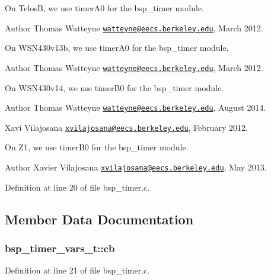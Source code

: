 On TelosB, we use timer\+A0 for the bsp\+\_\+timer module.

\begin{DoxyAuthor}{Author}
Thomas Watteyne \href{mailto:watteyne@eecs.berkeley.edu}{\tt watteyne@eecs.\+berkeley.\+edu}, March 2012.
\end{DoxyAuthor}
On W\+S\+N430v13b, we use timer\+A0 for the bsp\+\_\+timer module.

\begin{DoxyAuthor}{Author}
Thomas Watteyne \href{mailto:watteyne@eecs.berkeley.edu}{\tt watteyne@eecs.\+berkeley.\+edu}, March 2012.
\end{DoxyAuthor}
On W\+S\+N430v14, we use timer\+B0 for the bsp\+\_\+timer module.

\begin{DoxyAuthor}{Author}
Thomas Watteyne \href{mailto:watteyne@eecs.berkeley.edu}{\tt watteyne@eecs.\+berkeley.\+edu}, August 2014.

Xavi Vilajosana \href{mailto:xvilajosana@eecs.berkeley.edu}{\tt xvilajosana@eecs.\+berkeley.\+edu}, February 2012.
\end{DoxyAuthor}
On Z1, we use timer\+B0 for the bsp\+\_\+timer module.

\begin{DoxyAuthor}{Author}
Xavier Vilajosana \href{mailto:xvilajosana@eecs.berkeley.edu}{\tt xvilajosana@eecs.\+berkeley.\+edu}, May 2013. 
\end{DoxyAuthor}


Definition at line 20 of file bsp\+\_\+timer.\+c.



\subsection{Member Data Documentation}
\subsubsection[{\texorpdfstring{cb}{cb}}]{ bsp\+\_\+timer\+\_\+vars\+\_\+t\+::cb}\hypertarget{structbsp__timer__vars__t_a153fc3c53a86d984c22a4c28f3106eba}{}\label{structbsp__timer__vars__t_a153fc3c53a86d984c22a4c28f3106eba}


Definition at line 21 of file bsp\+\_\+timer.\+c.

